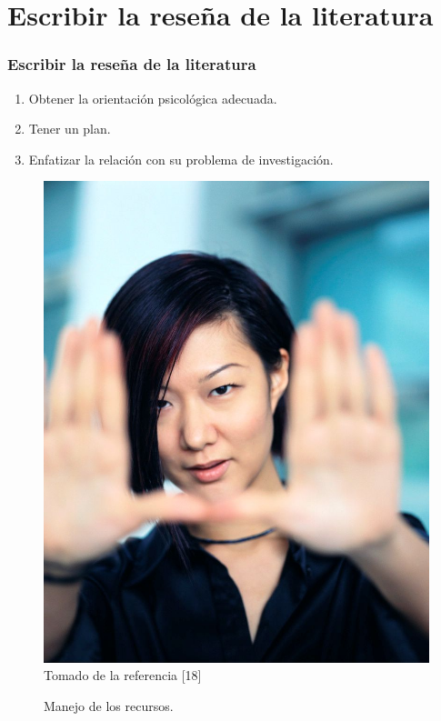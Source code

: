 \documentclass{beamer}
\newcounter{sauvegardeenumi}
\newcommand{\asuivre}{\setcounter{sauvegardeenumi}{\theenumi}}
\begin{document}
\section{Escribir la rese\~na de la literatura}
    \begin{frame}\frametitle{Escribir la rese\~na de la literatura}
    \begin{multicols}{2}
                \begin{enumerate}                    
                    \item Obtener la orientaci\'on psicol\'ogica adecuada.
                    \item Tener un plan.  
                    \item Enfatizar la relaci\'on con su problema de investigaci\'on.         
                    \asuivre
                \end{enumerate}
                \begin{figure}
                    \includegraphics[scale=0.10]{figures/focus}
                    \newline
                    {\tiny Tomado de la referencia [18] }
                    \caption{Manejo de los recursos. }
                \end{figure}
            \end{multicols}
    \end{frame}
\end{document}
